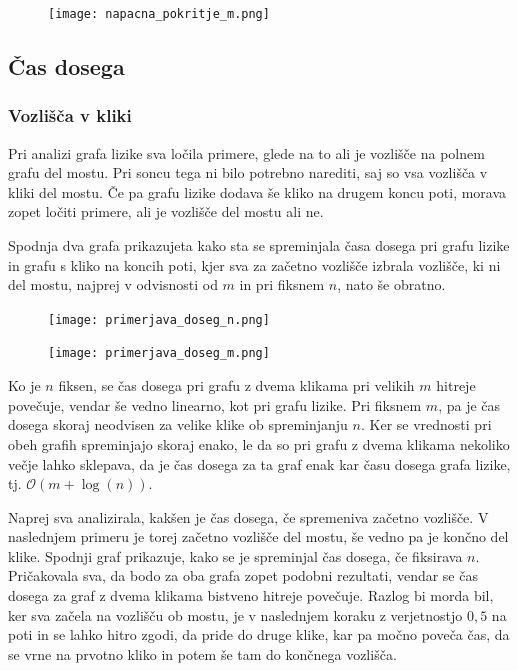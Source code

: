\documentclass[12pt,a4paper]{amsart}
\begin{document}
\begin{figure}[h]
\texttt{[image: napacna\_pokritje\_m.png]}
\end{figure}

\subsection{Čas dosega}
\subsubsection{Vozlišča v kliki}

Pri analizi grafa lizike sva ločila primere, glede na to ali je vozlišče na polnem grafu del mostu. Pri soncu
tega ni bilo potrebno narediti, saj so vsa vozlišča v kliki del mostu. Če pa grafu lizike dodava še kliko na drugem koncu poti,
morava zopet ločiti primere, ali je vozlišče del mostu ali ne.

Spodnja dva grafa prikazujeta kako sta se spreminjala časa dosega pri grafu lizike in grafu s kliko na koncih poti, kjer 
sva za začetno vozlišče izbrala vozlišče, ki ni del mostu, najprej
v odvisnosti od $m$ in pri fiksnem $n$, nato še obratno. 

\begin{figure}[h]
\texttt{[image: primerjava\_doseg\_n.png]}
\end{figure}

\begin{figure}[h]
\texttt{[image: primerjava\_doseg\_m.png]}
\end{figure}

Ko je $n$ fiksen, se čas dosega pri grafu z dvema klikama pri velikih $m$ hitreje povečuje, vendar
še vedno linearno, kot pri grafu lizike. 
Pri fiksnem $m$, pa je čas dosega skoraj neodvisen za velike klike ob spreminjanju $n$. Ker se vrednosti pri obeh
grafih spreminjajo skoraj enako, le da so pri grafu z dvema klikama nekoliko večje lahko sklepava, da je čas dosega
za ta graf enak kar času dosega grafa lizike, tj. $\mathcal{O}(m+\log(n))$.

Naprej sva analizirala, kakšen je čas dosega, če spremeniva začetno vozlišče. V naslednjem primeru je torej 
začetno vozlišče del mostu, še vedno pa je končno del klike. Spodnji graf prikazuje, kako se je spreminjal čas dosega, če fiksirava
$n$. Pričakovala sva, da bodo za oba grafa zopet podobni rezultati, vendar se čas dosega za graf z dvema klikama bistveno hitreje
povečuje. Razlog bi morda bil, ker sva začela na vozlišču ob mostu, je v naslednjem koraku z  verjetnostjo $0,5$ na poti in 
se lahko hitro zgodi, da pride do druge klike, kar pa močno poveča čas, da se vrne na prvotno kliko in potem še tam do 
končnega vozlišča.
\end{document}
